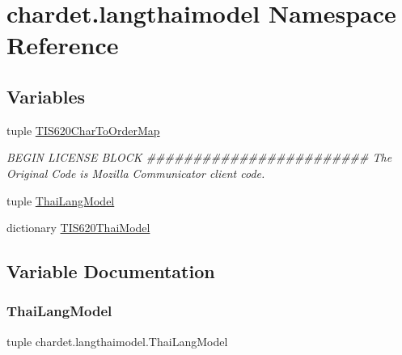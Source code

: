 \hypertarget{namespacechardet_1_1langthaimodel}{}\section{chardet.\+langthaimodel Namespace Reference}
\label{namespacechardet_1_1langthaimodel}
\subsection*{Variables}
\begin{DoxyCompactItemize}
\item 
tuple \hyperlink{namespacechardet_1_1langthaimodel_a2aef2e499b906761c6ba4d1fbcda42b9}{T\+I\+S620\+Char\+To\+Order\+Map}
\begin{DoxyCompactList}\small\item\em B\+E\+G\+IN L\+I\+C\+E\+N\+SE B\+L\+O\+CK \#\#\#\#\#\#\#\#\#\#\#\#\#\#\#\#\#\#\#\#\#\#\#\# The Original Code is Mozilla Communicator client code. \end{DoxyCompactList}\item 
tuple \hyperlink{namespacechardet_1_1langthaimodel_adcd31eab2182eb96444504b1a89327bc}{Thai\+Lang\+Model}
\item 
dictionary \hyperlink{namespacechardet_1_1langthaimodel_addc8ec9bc9cfa137a2b86d286cdf1589}{T\+I\+S620\+Thai\+Model}
\end{DoxyCompactItemize}


\subsection{Variable Documentation}
\mbox{\label{namespacechardet_1_1langthaimodel_adcd31eab2182eb96444504b1a89327bc}} 
\subsubsection{\texorpdfstring{Thai\+Lang\+Model}{ThaiLangModel}}
{\footnotesize\ttfamily tuple chardet.\+langthaimodel.\+Thai\+Lang\+Model}

\mbox{\label{namespacechardet_1_1langthaimodel_a2aef2e499b906761c6ba4d1fbcda42b9}} 
